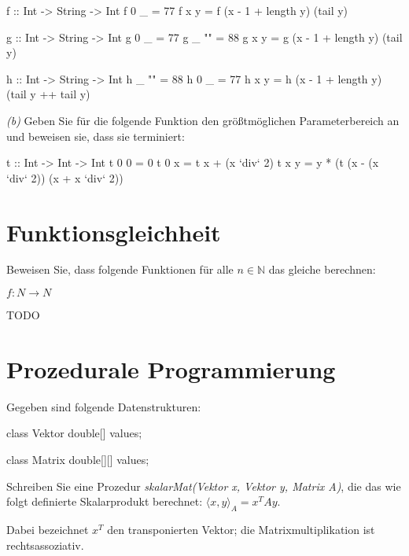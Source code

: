 \documentclass[11pt,a4paper,oneside,ngerman]{scrbook}
\begin{document}
\begin{code}
  f :: Int -> String -> Int
  f 0 _ = 77
  f x y = f (x - 1 + length y) (tail y)
\end{code}

\begin{code}
  g :: Int -> String -> Int
  g 0 _ = 77
  g _ "" = 88
  g x y = g (x - 1 + length y) (tail y)
\end{code}

\begin{code}
  h :: Int -> String -> Int
  h _ "" = 88
  h 0 _ = 77
  h x y = h (x - 1 + length y) (tail y ++ tail y)
\end{code}


\emph{(b)} Geben Sie für die folgende Funktion den größtmöglichen Parameterbereich an und beweisen sie, dass sie terminiert:

\begin{code}
t :: Int -> Int -> Int
t 0 0 = 0
t 0 x = t x + (x `div` 2)
t x y = y * (t (x - (x `div` 2)) (x + x `div` 2))
\end{code}

\newpage

\section{Funktionsgleichheit}
Beweisen Sie, dass folgende Funktionen für alle $n \in \mathbb{N}$ das gleiche berechnen:

$f: N \rightarrow N$

TODO

\newpage

\section{Prozedurale Programmierung}
Gegeben sind folgende Datenstrukturen:

\begin{code}
class Vektor {
  double[] values;
}

class Matrix {
  double[][] values;
}
\end{code}

Schreiben Sie eine Prozedur \emph{skalarMat(Vektor x, Vektor y, Matrix A)}, die das wie folgt definierte Skalarprodukt berechnet: $\langle x, y\rangle_A  =  x^TAy$.

Dabei bezeichnet $x^T$ den transponierten Vektor; die Matrixmultiplikation ist rechtsassoziativ.

\begin{code}
  double skalarMat(Vektor x, Vektor y, Matrix A) {
    
  
\end{code}
\end{document}
